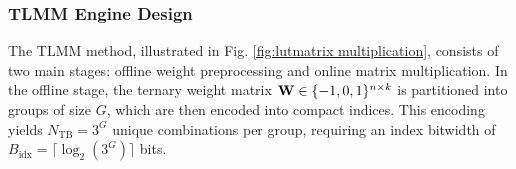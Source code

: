 \documentclass[sigconf]{acmart}
\begin{document}

\subsubsection{TLMM Engine Design} \label{sec:TLMM design}
The TLMM method, illustrated in Fig. \ref{fig:lutmatrix multiplication}, consists of two main stages: offline weight preprocessing and online matrix multiplication. In the offline stage, the ternary weight matrix \({\bf W} \in \{-1, 0, 1\}^{n \times k}\) is partitioned into groups of size $G$, which are then encoded into compact indices. This encoding yields \(N_{\text{TB}} = 3^{G}\) unique combinations per group, requiring an index bitwidth of \( B_{\text{idx}} = \lceil \log_2(3^G) \rceil \) bits.
\end{document}
